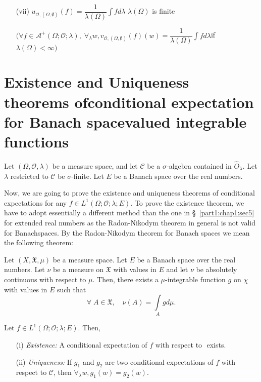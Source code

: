 \begin{itemize}
\item[{\rm (vii)}] \qquad $u_{\mathscr{O}, (\Omega, \emptyset)} (f) =
  \dfrac{1}{\lambda(\Omega)} \int f d \lambda$ 
  $\lambda(\Omega)$  is finite

$(\forall f \in \mathscr{A}^+ (\Omega; \mathscr{O}; \lambda), \;
  \forall_\lambda w, v_{\mathscr{O}, (\Omega, \emptyset)} (f) (w) =
  \dfrac{1}{\lambda(\Omega)} \int f d \lambda$\break  if 
  $\lambda(\Omega) < \infty)$

\end{itemize}

\section[Existence and Uniqueness theorems of conditional...]{Existence and 
Uniqueness theorems of\hfil\break conditional expectation
for Banach space\hfil\break valued integrable functions}\label{part1:chap1:sec6}

Let $(\Omega, \mathscr{O}, \lambda)$ be a measure space, and let
$\mathscr{C}$ be a $\sigma$-algebra contained in $\hat{O}_\lambda$.
Let $\lambda$ restricted to $\mathscr{C}$ be $\sigma$-finite. Let $E$
be a Banach space over the real numbers. 

Now, we are going to prove the existence and uniqueness theorems of
conditional expectations for any $f \in L^1(\Omega; \mathscr{O};
\lambda; E)$. To prove the existence theorem, we have to adopt
essentially a different method than the one in
\S\ \ref{part1:chap1:sec5} for extended 
real numbers as the Radon-Nikodym theorem in general is not valid for
Banach\pageoriginale spaces. By the Radon-Nikodym theorem for Banach
spaces we mean the following theorem:

Let $(X, \mathfrak{X}, \mu)$ be a measure space. Let $E$ be a Banach
space over the real numbers. Let $\nu$ be a measure on $\mathfrak{X}$
with values in $E$ and let $\nu$ be absolutely continuous with respect
to $\mu$. Then, there exists a $\mu$-integrable function $g$ on $\chi$
with values in $E$ such that 
$$
\forall \; A \in \mathfrak{X}, \quad \nu (A) = \int\limits_A g d \mu. 
$$

\begin{thm}\label{part1:chap1:thm4}
Let $f \in L^1 (\Omega; \mathscr{O}; \lambda; E)$. Then, 
\begin{itemize}
\item[{\rm (i)}] {\em Existence: } A conditional expectation of $f$
  with respect to $\mathfrak{}$ exists. 

\item[{\rm (ii)}] {\em Uniqueness: } If $g_1$ and $g_2$ are two
  conditional expectations of $f$ with respect to $\mathscr{C}$, then
  $\forall_\lambda w, g_1(w) = g_2 (w)$. 
\end{itemize}
\end{thm}

